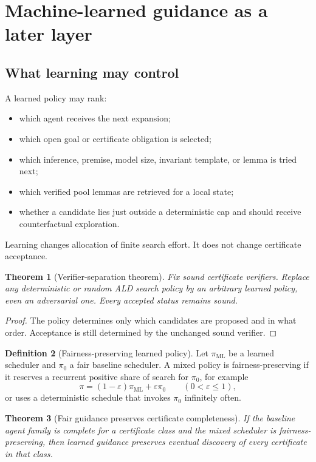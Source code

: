 \documentclass[11pt]{article}
\newtheorem{theorem}{Theorem}[section]
\theoremstyle{definition}
\newtheorem{definition}[theorem]{Definition}
\theoremstyle{remark}
\begin{document}
\section{Machine-learned guidance as a later layer}

\subsection{What learning may control}
A learned policy may rank:
\begin{itemize}
  \item which agent receives the next expansion;
  \item which open goal or certificate obligation is selected;
  \item which inference, premise, model size, invariant template, or lemma is tried next;
  \item which verified pool lemmas are retrieved for a local state;
  \item whether a candidate lies just outside a deterministic cap and should receive counterfactual exploration.
\end{itemize}
Learning changes allocation of finite search effort. It does not change certificate acceptance.

\begin{theorem}[Verifier-separation theorem]
Fix sound certificate verifiers. Replace any deterministic or random ALD search policy by an arbitrary learned policy, even an adversarial one. Every accepted status remains sound.
\end{theorem}

\begin{proof}
The policy determines only which candidates are proposed and in what order. Acceptance is still determined by the unchanged sound verifier.
\end{proof}

\begin{definition}[Fairness-preserving learned policy]
Let $\pi_{\mathrm{ML}}$ be a learned scheduler and $\pi_0$ a fair baseline scheduler. A mixed policy is fairness-preserving if it reserves a recurrent positive share of search for $\pi_0$, for example
\[
\pi=(1-\varepsilon)\pi_{\mathrm{ML}}+\varepsilon\pi_0
\qquad(0<\varepsilon\le1),
\]
or uses a deterministic schedule that invokes $\pi_0$ infinitely often.
\end{definition}

\begin{theorem}[Fair guidance preserves certificate completeness]
If the baseline agent family is complete for a certificate class and the mixed scheduler is fairness-preserving, then learned guidance preserves eventual discovery of every certificate in that class.
\end{theorem}
\end{document}
